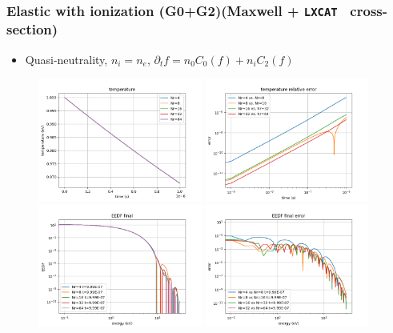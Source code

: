 \documentclass[mathserif, aspectratio=169]{beamer}
\newcommand{\lxcat}{\texttt{LXCAT}}
\begin{document}
	\begin{frame}
		\frametitle{Elastic with ionization (G0+G2)(Maxwell + \lxcat~ cross-section)}
		\begin{itemize}
			\item Quasi-neutrality, $n_i=n_e$, $\partial_t f = n_0 C_{0}(f) + n_i C_{2}(f)$
		\end{itemize}
		\begin{figure}
			\only<+>
			{
				\includegraphics[width=0.48\textwidth]{g02_mw_temp.png}
				\includegraphics[width=0.48\textwidth]{g02_mw_temp_error.png}
			}
			\only<+>
			{
				\includegraphics[width=0.48\textwidth]{g02_mw_eedf_final.png}
				\includegraphics[width=0.48\textwidth]{g02_mw_eedf_final_error.png}
}
\end{figure}
\end{frame}
\end{document}
